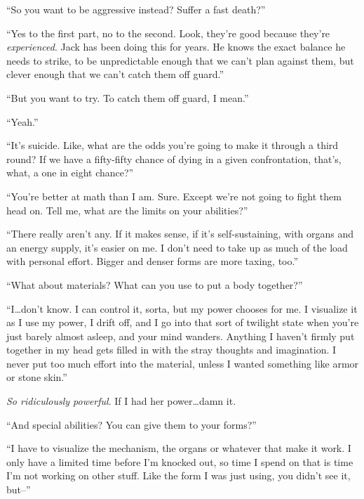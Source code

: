 ``So you want to be aggressive instead?  Suffer a fast death?''



``Yes to the first part, no to the second.  Look, they're good because they're \emph{experienced}.  Jack has been doing this for years.  He knows the exact balance he needs to strike, to be unpredictable enough that we can't plan against them, but clever enough that we can't catch them off guard.''



``But you want to try.  To catch them off guard, I mean.''



``Yeah.''



``It's suicide.  Like, what are the odds you're going to make it through a third round?  If we have a fifty-fifty chance of dying in a given confrontation, that's, what, a one in eight chance?''



``You're better at math than I am.  Sure.  Except we're not going to fight them head on.  Tell me, what are the limits on your abilities?''



``There really aren't any.  If it makes sense, if it's self-sustaining, with organs and an energy supply, it's easier on me.  I don't need to take up as much of the load with personal effort.  Bigger and denser forms are more taxing, too.''



``What about materials?  What can you use to put a body together?''



``I\ldots don't know.  I can control it, sorta, but my power chooses for me.  I visualize it as I use my power, I drift off, and I go into that sort of twilight state when you're just barely almost asleep, and your mind wanders.  Anything I haven't firmly put together in my head gets filled in with the stray thoughts and imagination.  I never put too much effort into the material, unless I wanted something like armor or stone skin.''



\emph{So ridiculously powerful}.  If I had her power\ldots damn it.



``And special abilities?  You can give them to your forms?''



``I have to visualize the mechanism, the organs or whatever that make it work.  I only have a limited time before I'm knocked out, so time I spend on that is time I'm not working on other stuff.  Like the form I was just using, you didn't see it, but--''



